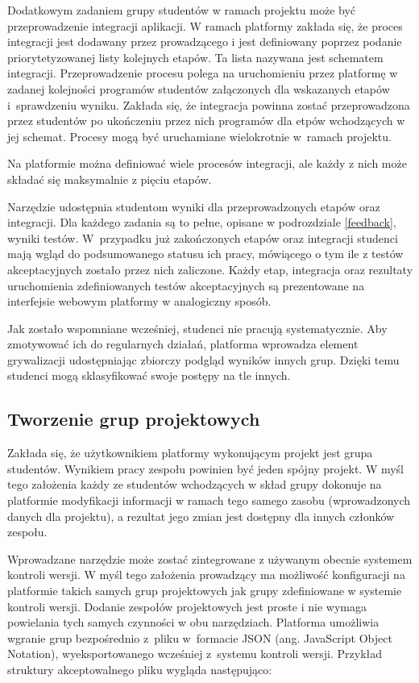 Dodatkowym zadaniem grupy studentów w ramach projektu może być przeprowadzenie integracji aplikacji.
W ramach platformy zakłada się, że proces integracji jest dodawany przez prowadzącego i jest definiowany poprzez podanie priorytetyzowanej listy kolejnych etapów.
Ta lista nazywana jest schematem integracji.
Przeprowadzenie procesu polega na uruchomieniu przez platformę w zadanej kolejności programów studentów załączonych dla wskazanych etapów i~sprawdzeniu wyniku.
Zakłada się, że integracja powinna zostać przeprowadzona przez studentów po ukończeniu przez nich programów dla etpów wchodzących w jej schemat.
Procesy mogą być uruchamiane wielokrotnie w~ramach projektu.

Na platformie można definiować wiele procesów integracji, ale każdy z nich może składać się maksymalnie z pięciu etapów.

Narzędzie udostępnia studentom wyniki dla przeprowadzonych etapów oraz integracji.
Dla każdego zadania są to pełne, opisane w podrozdziale \ref{feedback}, wyniki testów.
W~przypadku już zakończonych etapów oraz integracji studenci mają wgląd do podsumowanego statusu ich pracy, mówiącego o tym ile z testów akceptacyjnych zostało przez nich zaliczone.
Każdy etap, integracja oraz rezultaty uruchomienia zdefiniowanych testów akceptacyjnych są prezentowane na interfejsie webowym platformy w analogiczny sposób.

Jak zostało wspomniane wcześniej, studenci nie pracują systematycznie.
Aby zmotywować ich do regularnych działań, platforma wprowadza element grywalizacji udostępniając zbiorczy podgląd wyników innych grup.
Dzięki temu studenci mogą sklasyfikować swoje postępy na tle innych.


\subsection{Tworzenie grup projektowych}
\label{adding_project_groups}

Zakłada się, że użytkownikiem platformy wykonującym projekt jest grupa studentów.
Wynikiem pracy zespołu powinien być jeden spójny projekt.
W myśl tego założenia każdy ze studentów wchodzących w skład grupy dokonuje na platformie modyfikacji informacji w ramach tego samego zasobu (wprowadzonych danych dla projektu), a rezultat jego zmian jest dostępny dla innych członków zespołu.

Wprowadzane narzędzie może zostać zintegrowane z używanym obecnie systemem kontroli wersji.
W myśl tego założenia prowadzący ma możliwość konfiguracji na platformie takich samych grup projektowych jak grupy zdefiniowane w systemie kontroli wersji.
Dodanie zespołów projektowych jest proste i nie wymaga powielania tych samych czynności w obu narzędziach.
Platforma umożliwia wgranie grup bezpośrednio z~pliku w~formacie JSON (ang. JavaScript Object Notation), wyeksportowanego wcześniej z~systemu kontroli wersji.
Przykład struktury akceptowalnego pliku wygląda następująco:

